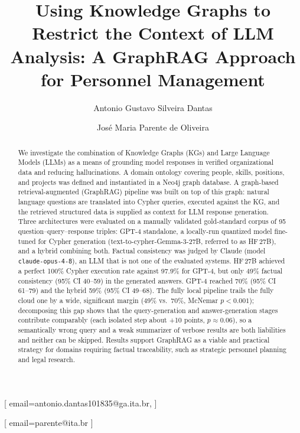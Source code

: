 \documentclass{ceurart}
\begin{document}


\title{Using Knowledge Graphs to Restrict the Context of LLM Analysis:
A GraphRAG Approach for Personnel Management}

\author[1]{Antonio Gustavo Silveira Dantas}[
  email=antonio.dantas101835@ga.ita.br,
]
\cormark[1]
\address[1]{Núcleo Corporativo de Tecnologia da Informação,
            São José dos Campos, SP, Brazil}

\author[2]{José Maria Parente de Oliveira}[
  email=parente@ita.br
]
\address[2]{Instituto Tecnológico de Aeronáutica,
            São José dos Campos, SP, Brazil}

\begin{abstract}
We investigate the combination of Knowledge Graphs (KGs) and Large Language
Models (LLMs) as a means of grounding model responses in verified organizational
data and reducing hallucinations. A domain ontology covering people, skills,
positions, and projects was defined and instantiated in a Neo4j graph database.
A graph-based retrieval-augmented (GraphRAG) pipeline was built on top of this
graph: natural language questions are translated into Cypher queries, executed
against the KG, and the retrieved structured data is supplied as context for LLM
response generation. Three architectures were evaluated on a manually validated
gold-standard corpus of 95 question--query--response triples: GPT-4 standalone,
a locally-run quantized model fine-tuned for Cypher generation
(text-to-cypher-Gemma-3-27B, referred to as HF\,27B), and a hybrid combining
both. Factual consistency was judged by Claude (model \texttt{claude-opus-4-8}), an
LLM that is not one of the evaluated systems. HF\,27B achieved a perfect 100\%
Cypher execution rate against 97.9\% for GPT-4, but only 49\% factual consistency
(95\% CI 40--59) in the generated answers. GPT-4 reached 70\% (95\% CI 61--79) and
the hybrid 59\% (95\% CI 49--68). The fully local pipeline trails the fully cloud
one by a wide, significant margin (49\% vs.\ 70\%, McNemar $p<0.001$); decomposing
this gap shows that the query-generation and answer-generation stages contribute
comparably (each isolated step about +10 points, $p\approx0.06$), so a semantically
wrong query and a weak summarizer of verbose results are both liabilities and
neither can be skipped. Results support GraphRAG as a viable and practical
strategy for domains requiring factual traceability, such as strategic personnel
planning and legal research.
\end{abstract}
\end{document}
